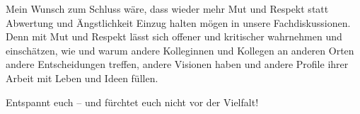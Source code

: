 \documentclass[a4paper,
fontsize=11pt,
oneside,
numbers=noperiodatend,
parskip=half-,
bibliography=totoc,
final
]{scrartcl}
\begin{document}
Mein Wunsch zum Schluss wäre, dass wieder mehr Mut und Respekt statt
Abwertung und Ängstlichkeit Einzug halten mögen in unsere
Fachdiskussionen. Denn mit Mut und Respekt lässt sich offener und
kritischer wahrnehmen und einschätzen, wie und warum andere Kolleginnen
und Kollegen an anderen Orten andere Entscheidungen treffen, andere
Visionen haben und andere Profile ihrer Arbeit mit Leben und Ideen
füllen.

Entspannt euch -- und fürchtet euch nicht vor der Vielfalt!

\end{document}
